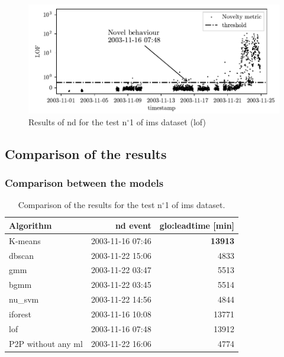 \begin{figure}
    \centering
    \includegraphics{images/IMS/Novelty_01_500samples_bearing3x_lof.pdf}
    \caption{Results of \gls{nd} for the test $\text{n}^\circ$1 of \gls{ims} dataset (\gls{lof})}
    \label{fig:NoveltyScore_01_lof}
\end{figure}

\subsection{Comparison of the results}

\subsubsection{Comparison between the models}

\begin{table}
    \centering
    \caption{Comparison of the results for the test $\text{n}^\circ$1 of \gls{ims} dataset.}
    \label{tab:ims01_comparision}
    \begin{tabular}{lrr} 
    \toprule
    \textbf{Algorithm} & \textbf{\gls{nd} event} & \textbf{\gls{glo:leadtime} }{[}min] \\ 
    \hline
    K-means & 2003-11-16 07:46 & \textbf{13913} \\
    \gls{dbscan} & 2003-11-22 15:06 & 4833 \\
    \gls{gmm} & 2003-11-22 03:47 & 5513 \\
    \gls{bgmm} & 2003-11-22 03:45 & 5514 \\
    \gls{nu_svm} & 2003-11-22 14:56 & 4844 \\
    \gls{iforest} & 2003-11-16 10:08 & 13771 \\
    \gls{lof} & 2003-11-16 07:48 & 13912 \\
    {P2P} without any \gls{ml} & 2003-11-22 16:06 & 4774 \\
    \bottomrule
    \end{tabular}
\end{table}

